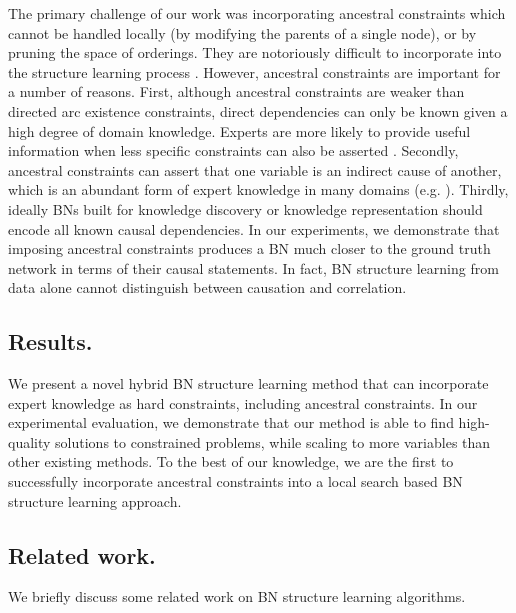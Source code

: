 \documentclass[twoside,11pt]{article}
\begin{document}
\smallskip
The primary challenge of our work was incorporating ancestral constraints which cannot be
handled locally (by modifying the parents of a single node), or by pruning the space of orderings.
They are notoriously difficult to incorporate into the structure learning process \citep{Chen2016}. However, ancestral constraints are important 
for a number of reasons. First, although ancestral
constraints are weaker than directed arc existence constraints, direct dependencies can only be known given a high degree of 
domain knowledge. Experts are more likely to provide useful information when less specific constraints can also be asserted \citep{Flores2011}.
Secondly, ancestral constraints can assert that one variable is an indirect cause of another, which is an abundant form of expert
knowledge in many domains (e.g. \cite{Sahin2006, Ma2017, Leu2013, Chen2014, Giordano2013}). Thirdly, ideally BNs built for knowledge discovery
or knowledge representation should encode all known causal dependencies. In our experiments, we demonstrate that imposing ancestral
constraints produces a BN much closer to the ground truth network in terms of their causal statements. In fact, BN structure
learning from data alone cannot distinguish between causation and correlation.

\subsection{Results.} We present a novel hybrid BN structure learning method that can incorporate expert knowledge as hard constraints,
including ancestral constraints. In our experimental evaluation, we demonstrate that our method is able to find high-quality solutions to 
constrained problems, while scaling to more variables than other existing methods. To the best of our knowledge, we are the first to 
successfully incorporate ancestral constraints into a local search based BN structure learning approach. 


\subsection{Related work.} We briefly discuss some related work on BN structure learning algorithms.
\end{document}
